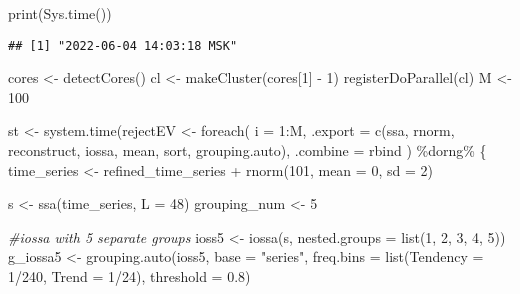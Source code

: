 \documentclass[
]{article}
\newenvironment{Shaded}{\begin{snugshade}}{\end{snugshade}}
\newcommand{\AttributeTok}[1]{\textcolor[rgb]{0.77,0.63,0.00}{#1}}
\newcommand{\CommentTok}[1]{\textcolor[rgb]{0.56,0.35,0.01}{\textit{#1}}}
\newcommand{\DecValTok}[1]{\textcolor[rgb]{0.00,0.00,0.81}{#1}}
\newcommand{\FloatTok}[1]{\textcolor[rgb]{0.00,0.00,0.81}{#1}}
\newcommand{\FunctionTok}[1]{\textcolor[rgb]{0.00,0.00,0.00}{#1}}
\newcommand{\NormalTok}[1]{#1}
\newcommand{\OtherTok}[1]{\textcolor[rgb]{0.56,0.35,0.01}{#1}}
\newcommand{\SpecialCharTok}[1]{\textcolor[rgb]{0.00,0.00,0.00}{#1}}
\newcommand{\StringTok}[1]{\textcolor[rgb]{0.31,0.60,0.02}{#1}}
\begin{document}
\begin{Shaded}
\begin{Highlighting}[]
  \FunctionTok{print}\NormalTok{(}\FunctionTok{Sys.time}\NormalTok{())}
\end{Highlighting}
\end{Shaded}

\begin{verbatim}
## [1] "2022-06-04 14:03:18 MSK"
\end{verbatim}

\begin{Shaded}
\begin{Highlighting}[]
\NormalTok{  cores }\OtherTok{\textless{}{-}} \FunctionTok{detectCores}\NormalTok{()}
\NormalTok{  cl }\OtherTok{\textless{}{-}} \FunctionTok{makeCluster}\NormalTok{(cores[}\DecValTok{1}\NormalTok{] }\SpecialCharTok{{-}} \DecValTok{1}\NormalTok{)}
  \FunctionTok{registerDoParallel}\NormalTok{(cl)}
\NormalTok{  M }\OtherTok{\textless{}{-}} \DecValTok{100}
  
\NormalTok{  st }\OtherTok{\textless{}{-}} \FunctionTok{system.time}\NormalTok{(rejectEV }\OtherTok{\textless{}{-}} \FunctionTok{foreach}\NormalTok{(}
    \AttributeTok{i =} \DecValTok{1}\SpecialCharTok{:}\NormalTok{M,}
    \AttributeTok{.export =} \FunctionTok{c}\NormalTok{(}\StringTok{\textquotesingle{}ssa\textquotesingle{}}\NormalTok{, }\StringTok{\textquotesingle{}rnorm\textquotesingle{}}\NormalTok{, }\StringTok{\textquotesingle{}reconstruct\textquotesingle{}}\NormalTok{, }\StringTok{\textquotesingle{}iossa\textquotesingle{}}\NormalTok{, }\StringTok{\textquotesingle{}mean\textquotesingle{}}\NormalTok{, }\StringTok{\textquotesingle{}sort\textquotesingle{}}\NormalTok{, }\StringTok{\textquotesingle{}grouping.auto\textquotesingle{}}\NormalTok{),}
    \AttributeTok{.combine =}\NormalTok{ rbind}
\NormalTok{  ) }\SpecialCharTok{\%dorng\%}\NormalTok{ \{}
\NormalTok{    time\_series }\OtherTok{\textless{}{-}}\NormalTok{ refined\_time\_series }\SpecialCharTok{+} \FunctionTok{rnorm}\NormalTok{(}\DecValTok{101}\NormalTok{, }\AttributeTok{mean =} \DecValTok{0}\NormalTok{, }\AttributeTok{sd =} \DecValTok{2}\NormalTok{)}
    
\NormalTok{    s }\OtherTok{\textless{}{-}} \FunctionTok{ssa}\NormalTok{(time\_series, }\AttributeTok{L =} \DecValTok{48}\NormalTok{)}
\NormalTok{    grouping\_num }\OtherTok{\textless{}{-}} \DecValTok{5}
    
    \CommentTok{\#iossa with 5 separate groups}
\NormalTok{    ioss5 }\OtherTok{\textless{}{-}} \FunctionTok{iossa}\NormalTok{(s, }\AttributeTok{nested.groups =} \FunctionTok{list}\NormalTok{(}\DecValTok{1}\NormalTok{, }\DecValTok{2}\NormalTok{, }\DecValTok{3}\NormalTok{, }\DecValTok{4}\NormalTok{, }\DecValTok{5}\NormalTok{))}
\NormalTok{    g\_iossa5 }\OtherTok{\textless{}{-}} \FunctionTok{grouping.auto}\NormalTok{(ioss5, }\AttributeTok{base =} \StringTok{"series"}\NormalTok{, }
                   \AttributeTok{freq.bins =} \FunctionTok{list}\NormalTok{(}\AttributeTok{Tendency =} \DecValTok{1}\SpecialCharTok{/}\DecValTok{240}\NormalTok{, }\AttributeTok{Trend =} \DecValTok{1}\SpecialCharTok{/}\DecValTok{24}\NormalTok{), }
                   \AttributeTok{threshold =} \FloatTok{0.8}\NormalTok{)}
                   

\end{Highlighting}
\end{Shaded}
\end{document}
